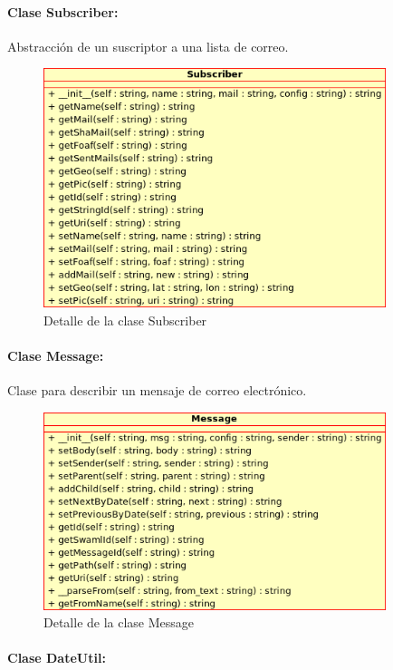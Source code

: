 \paragraph{Clase Subscriber:}

Abstracción de un suscriptor a una lista de correo.

\begin{figure}[H]
	\centering
 	\includegraphics[width=10cm]{images/uml/clases/subscriber-class.png}
	\caption{Detalle de la clase Subscriber}
	\label{fig:uml:subscriber-class}
\end{figure}

\paragraph{Clase Message:}

Clase para describir un mensaje de correo electrónico.

\begin{figure}[H]
	\centering
 	\includegraphics[width=10cm]{images/uml/clases/message-class.png}
	\caption{Detalle de la clase Message}
	\label{fig:uml:message-class}
\end{figure}

\paragraph{Clase DateUtil:}

